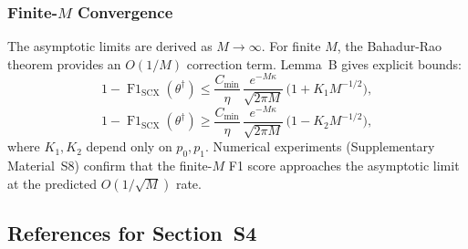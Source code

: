 \subsubsection{Finite-$M$ Convergence}

The asymptotic limits are derived as $M\to\infty$.  For finite $M$, the
Bahadur-Rao theorem provides an $O(1/M)$ correction term.  Lemma~B gives
explicit bounds:
\[
1-\operatorname{F1}_{\text{SCX}}(\theta^\dagger)
\le \frac{C_{\min}}{\eta}\,
    \frac{e^{-M\kappa}}{\sqrt{2\pi M}}\,
    \bigl(1 + K_1 M^{-1/2}\bigr),
\]
\[
1-\operatorname{F1}_{\text{SCX}}(\theta^\dagger)
\ge \frac{C_{\min}}{\eta}\,
    \frac{e^{-M\kappa}}{\sqrt{2\pi M}}\,
    \bigl(1 - K_2 M^{-1/2}\bigr),
\]
where $K_1,K_2$ depend only on $p_0,p_1$.  Numerical experiments
(Supplementary Material~S8) confirm that the finite-$M$ F1 score approaches
the asymptotic limit at the predicted $O(1/\sqrt{M})$ rate.

\subsection*{References for Section~S4}

\begingroup
\small


\endgroup

\endinput
